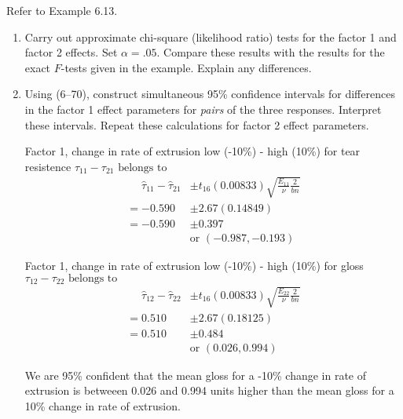 Refer to Example 6.13.
\begin{enumerate}[label= (\alph*)]
    \item Carry out approximate chi-square (likelihood ratio) tests for the factor 1 and factor 2
    effects. Set $\alpha = .05$. Compare these results with the results for the exact $F$-tests given
    in the example. Explain any differences.
    \item Using (6--70), construct simultaneous 95\% confidence intervals for differences in the
    factor 1 effect parameters for \textit{pairs} of the three responses. Interpret these intervals.
    Repeat these calculations for factor 2 effect parameters.

    Factor 1, change in rate of extrusion low (-10\%) - high (10\%) for tear resistence \newline
    $\tau_{11} - \tau_{21}\text{ belongs to}$
    \begin{align*}
        \phantom{=}
        \hat{\tau}_{11} - \hat{\tau}_{21}
        & \pm
        t_{16}(0.00833)
        \sqrt{\frac{E_{11}}{\nu}\frac{2}{bn}}
        \\
        =
        -0.590
        & \pm
        2.67(0.14849)
        \\
        =
        -0.590
        & \pm
        0.397
        \\
        \phantom{\pm 0.590}
        &
        \text{or }
        (-0.987, -0.193)
    \end{align*}
    
    Factor 1, change in rate of extrusion low (-10\%) - high (10\%) for gloss \newline
    $\tau_{12} - \tau_{22}\text{ belongs to}$
    \begin{align*}
        \phantom{=}
        \hat{\tau}_{12} - \hat{\tau}_{22}
        & \pm
        t_{16}(0.00833)
        \sqrt{\frac{E_{22}}{\nu}\frac{2}{bn}}
        \\
        =
        0.510
        & \pm
        2.67(0.18125)
        \\
        =
        0.510
        & \pm
        0.484
        \\
        \phantom{\pm 0.590}
        &
        \text{or }
        (0.026, 0.994)
    \end{align*}

    We are 95\% confident that the mean gloss for a -10\% change in rate of extrusion is betweeen 0.026 and 0.994 units higher than the mean gloss for a 10\% change in rate of extrusion.
    

\end{enumerate}
